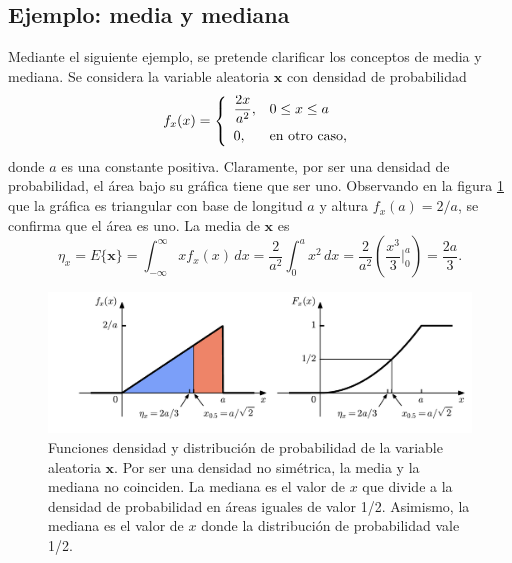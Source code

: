 \documentclass[a4paper]{report}
\newcommand{\x}{\mathbf{x}}
\begin{document}
\subsection{Ejemplo: media y mediana}

Mediante el siguiente ejemplo, se pretende clarificar los conceptos de media y mediana. Se considera la variable aleatoria \(\x\) con densidad de probabilidad 
\[\def\arraystretch{1.5}
f_x(x)=\left\{
 \begin{array}{ll}
 \dfrac{2x}{a^2},&0\leq x\leq a\\
 0,&\textrm{en otro caso,}
 \end{array}\right.
\]
donde \(a\) es una constante positiva. Claramente, por ser una densidad de probabilidad, el área bajo su gráfica tiene que ser uno. Observando en la figura \ref{fig:mean_and_median_example} que la gráfica es triangular con base de longitud \(a\) y altura \(f_x(a)=2/a\), se confirma que el área es uno. La media de \(\x\) es
\[
 \eta_x=E\{\x\}=\int_{-\infty}^{\infty}xf_x(x)\,dx
  =\frac{2}{a^2}\int_{0}^{a}x^2\,dx
  =\frac{2}{a^2}\left(\frac{x^3}{3}\bigg|_0^a\right)
  =\frac{2a}{3}.
\]
\begin{figure}[!htb]
\begin{center}
  \includegraphics[width=\textwidth]{figuras/mean_and_median_example.pdf}
  \caption{
       Funciones densidad y distribución de probabilidad de la variable aleatoria \(\x\). Por ser una densidad no simétrica, la media y la mediana no coinciden. La mediana es el valor de \(x\) que divide a la densidad de probabilidad en áreas iguales de valor 1/2. Asimismo, la mediana es el valor de \(x\) donde la distribución de probabilidad vale 1/2.
    } \label{fig:mean_and_median_example}
\end{center}
\end{figure}
\end{document}
